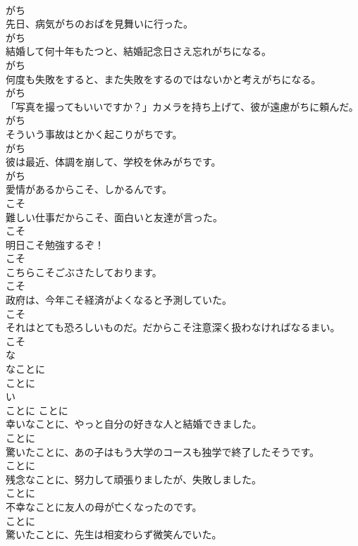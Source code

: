 \documentclass[8pt]{extreport}
\begin{document}
\begin{CJK}{UTF8}{min}
\\	がち
\\	先日、病気がちのおばを見舞いに行った。	
\\	がち
\\	結婚して何十年もたつと、結婚記念日さえ忘れがちになる。	
\\	がち
\\	何度も失敗をすると、また失敗をするのではないかと考えがちになる。	
\\	がち
\\	「写真を撮ってもいいですか？」カメラを持ち上げて、彼が遠慮がちに頼んだ。	
\\	がち
\\	そういう事故はとかく起こりがちです。	
\\	がち
\\	彼は最近、体調を崩して、学校を休みがちです。	
\\	がち
\\	愛情があるからこそ、しかるんです。	
\\	こそ
\\	難しい仕事だからこそ、面白いと友達が言った。	
\\	こそ
\\	明日こそ勉強するぞ！	
\\	こそ
\\	こちらこそごぶさたしております。	
\\	こそ
\\	政府は、今年こそ経済がよくなると予測していた。	
\\	こそ
\\	それはとても恐ろしいものだ。だからこそ注意深く扱わなければなるまい。	
\\	こそ
\\	な
\\	なことに	
\\	ことに	
\\	い
\\	ことに	ことに
\\	幸いなことに、やっと自分の好きな人と結婚できました。	
\\	ことに
\\	驚いたことに、あの子はもう大学のコースも独学で終了したそうです。	
\\	ことに
\\	残念なことに、努力して頑張りましたが、失敗しました。	
\\	ことに
\\	不幸なことに友人の母が亡くなったのです。	
\\	ことに
\\	驚いたことに、先生は相変わらず微笑んでいた。	

\end{CJK}
\end{document}
